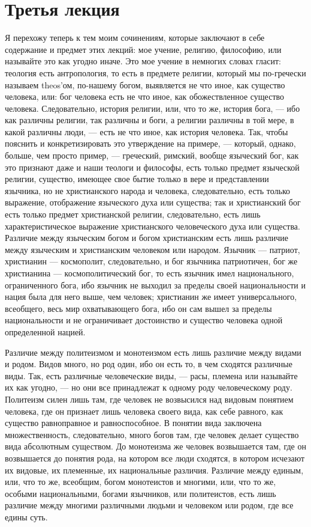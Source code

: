 \documentclass[12pt]{article}
\begin{document}
{}
\section*{Третья лекция}

Я перехожу теперь к тем моим сочинениям, которые заключают в себе содержание и предмет этих лекций: мое учение, религию, философию, или называйте это как угодно иначе. Это мое учение в немногих словах гласит: теология есть антропология, то есть в предмете религии, который мы по-гречески называем theos'ом, по-нашему богом, выявляется не что иное, как существо человека, или: бог человека есть не что иное, как обожествленное существо человека. Следовательно, история религии, или, что то же, история бога, --- ибо как различны религии, так различны и боги, а религии различны в той мере, в какой различны люди, --- есть не что иное, как история человека. Так, чтобы пояснить и конкретизировать это утверждение на примере,  --- который, однако, больше, чем просто пример, --- греческий, римский, вообще языческий бог, как это признают даже и наши теологи и философы, есть только предмет языческой религии, существо, имеющее свое бытие только в вере и представлении язычника, но не христианского народа и человека, следовательно, есть только выражение, отображение языческого духа или существа; так и христианский бог есть только предмет христианской религии, следовательно, есть лишь характеристическое выражение христианского человеческого духа или существа. Различие между языческим богом и богом христианским есть лишь различие между языческим и христианским человеком или народом. Язычник --- патриот, христианин --- космополит, следовательно, и бог язычника патриотичен, бог же христианина --- космополитический бог, то есть язычник имел национального, ограниченного бога, ибо язычник не выходил за пределы своей национальности и нация была для него выше, чем человек; христианин же имеет универсального, всеобщего, весь мир охватывающего бога, ибо он сам вышел за пределы национальности и не ограничивает достоинство и существо человека одной определенной нацией. 

Различие между политеизмом и монотеизмом есть лишь различие между видами и родом. Видов много, но род один, ибо он есть то, в чем сходятся различные виды. Так, есть различные человеческие виды, --- расы, племена или называйте их как угодно, --- но они все принадлежат к одному роду человеческому роду. Политеизм силен лишь там, где человек не возвысился над видовым понятием человека, где он признает лишь человека своего вида, как себе равного, как существо равноправное и равноспособное. В понятии вида заключена множественность, следовательно, много богов там, где человек делает существо вида абсолютным существом. До монотеизма же человек возвышается там, где он возвышается до понятия рода, на котором все люди сходятся, в котором исчезают их видовые, их племенные, их национальные различия. Различие между единым, или, что то же, всеобщим, богом монотеистов и многими, или, что то же, особыми национальными, богами язычников, или политеистов, есть лишь различие между многими различными людьми и человеком или родом, где все едины суть. 
\end{document}
